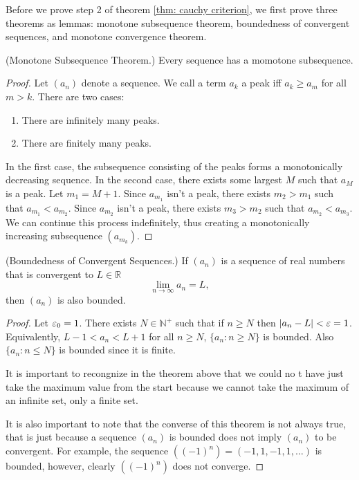 \documentclass[10pt]{article}
\begin{document}
	Before we prove step 2 of theorem \ref{thm: cauchy criterion}, we first prove three theorems as lemmas: monotone subsequence theorem, boundedness of convergent sequences, and monotone convergence theorem.
	\begin{lemma}\label{lm: monotone subsequence theorem}
		(Monotone Subsequence Theorem.) Every sequence has a momotone subsequence.
	\end{lemma}
	\begin{proof}
		Let $(a_n)$ denote a sequence. We call a term $a_k$ a peak iff $a_k \ge a_m$ for all $m > k$. There are two cases:
		\begin{enumerate}
			\item There are infinitely many peaks.
			\item There are finitely many peaks.
		\end{enumerate}
		In the first case, the subsequence consisting of the peaks forms a monotonically decreasing sequence. In the second case, there exists some largest $M$ such that $a_M$ is a peak. Let $m_1 = M+1$. Since $a_{m_1}$ isn't a peak, there exists $m_2 > m_1$ such that $a_{m_1} < a_{m_2}$. Since $a_{m_2}$ isn't a peak, there exists $m_3 > m_2$ such that $a_{m_2} < a_{m_3}$. We can continue this process indefinitely, thus creating a monotonically increasing subsequence $(a_{m_k})$.
	\end{proof}
	\begin{lemma}\label{lm: boundedness of convergent sequence}
		(Boundedness of Convergent Sequences.) If $(a_n)$ is a sequence of real numbers that is convergent to $L \in \mathbb{R}$
		\begin{equation}
			\lim_{n \to \infty} a_n = L,
		\end{equation}
		then $(a_n)$ is also bounded.
	\end{lemma}
	\begin{proof}
		Let $\varepsilon_0 = 1$. There exists $N \in \mathbb{N}^+$ such that if $n \ge N$ then $\abs{a_n - L} < \varepsilon = 1$. Equivalently, $L-1 < a_n < L+1$ for all $n \ge N$, $\{ a_n: n \ge N \}$ is bounded. Also $\{ a_n: n \le N \}$ is bounded since it is finite.

		It is important to recongnize in the theorem above that we could no t have just take the maximum value from the start because we cannot take the maximum of an infinite set, only a finite set.

		It is also important to note that the converse of this theorem is not always true, that is just because a sequence $(a_n)$ is bounded does not imply $(a_n)$ to be convergent. For example, the sequence $((-1)^n) = (-1, 1, -1, 1, \dots)$ is bounded, however, clearly $((-1)^n)$ does not converge.
	\end{proof}
\end{document}
